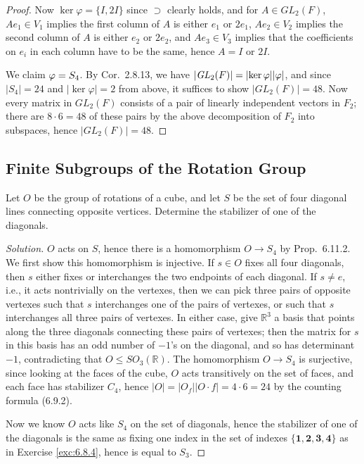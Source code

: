 \documentclass[12pt]{article}
\theoremstyle{remark}
\let\Im\relax
\DeclareMathOperator{\Im}{im}
\newcommand{\GL}{\mathit{GL}}
\begin{document}
\begin{proof}
  \par Now $\ker\varphi = \{I,2I\}$ since $\supset$ clearly holds, and for $A \in \GL_2(F)$, $Ae_1 \in V_1$ implies the first column of $A$ is either $e_1$ or $2e_1$, $Ae_2 \in V_2$ implies the second column of $A$ is either $e_2$ or $2e_2$, and $Ae_3 \in V_3$ implies that the coefficients on $e_i$ in each column have to be the same, hence $A = I$ or $2I$.
  \par We claim $\Im\varphi = S_4$. By Cor.~2.8.13, we have $\lvert \GL_2(F) \rvert = \lvert \ker\varphi\rvert\lvert\Im\varphi\rvert$, and since $\lvert S_4 \rvert = 24$ and $\lvert \ker\varphi \rvert = 2$ from above, it suffices to show $\lvert \GL_2(F) \rvert = 48$. Now every matrix in $\GL_2(F)$ consists of a pair of linearly independent vectors in $F_2$; there are $8 \cdot 6 = 48$ of these pairs by the above decomposition of $F_2$ into subspaces, hence $\lvert \GL_2(F) \rvert = 48$.
\end{proof}

\subsection{Finite Subgroups of the Rotation Group}
\setcounter{subsubsection}{2}
\begin{problem}
  Let $O$ be the group of rotations of a cube, and let $S$ be the set of four diagonal lines connecting opposite vertices. Determine the stabilizer of one of the diagonals.
\end{problem}
\begin{proof}[Solution]
  $O$ acts on $S$, hence there is a homomorphism $O \to S_4$ by Prop.~6.11.2. We first show this homomorphism is injective. If $s \in O$ fixes all four diagonals, then $s$ either fixes or interchanges the two endpoints of each diagonal. If $s \ne e$, i.e., it acts nontrivially on the vertexes, then we can pick three pairs of opposite vertexes such that $s$ interchanges one of the pairs of vertexes, or such that $s$ interchanges all three pairs of vertexes. In either case, give $\mathbb{R}^3$ a basis that points along the three diagonals connecting these pairs of vertexes; then the matrix for $s$ in this basis has an odd number of $-1$'s on the diagonal, and so has determinant $-1$, contradicting that $O \leqslant SO_3(\mathbb{R})$. The homomorphism $O \to S_4$ is surjective, since looking at the faces of the cube, $O$ acts transitively on the set of faces, and each face has stabilizer $C_4$, hence $\lvert O \rvert = \lvert O_f \rvert \lvert O \cdot f \rvert = 4 \cdot 6 = 24$ by the counting formula (6.9.2).
  \par Now we know $O$ acts like $S_4$ on the set of diagonals, hence the stabilizer of one of the diagonals is the same as fixing one index in the set of indexes $\{\mathbf{1},\mathbf{2},\mathbf{3},\mathbf{4}\}$ as in Exercise \ref{exc:6.8.4}, hence is equal to $S_3$.
\end{proof}
\end{document}

